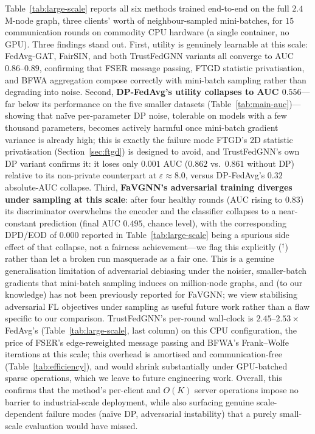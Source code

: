 \documentclass[pdflatex,sn-mathphys-num]{sn-jnl}
\theoremstyle{thmstyleone}%
\theoremstyle{thmstyletwo}%
\theoremstyle{thmstylethree}%
\begin{document}
Table~\ref{tab:large-scale} reports all six methods trained end-to-end on the
full $2.4$M-node graph, three clients' worth of neighbour-sampled mini-batches,
for $15$ communication rounds on commodity CPU hardware (a single
container, no GPU). Three findings stand out. First, utility is genuinely
learnable at this scale: FedAvg-GAT, FairSIN, and both TrustFedGNN variants all
converge to AUC $0.86$--$0.89$, confirming that FSER message passing, FTGD
statistic privatisation, and BFWA aggregation compose correctly with
mini-batch sampling rather than degrading into noise. Second,
\textbf{DP-FedAvg's utility collapses to AUC $0.556$}---far below its
performance on the five smaller datasets (Table~\ref{tab:main-auc})---showing
that naïve per-parameter DP noise, tolerable on models with a few thousand
parameters, becomes actively harmful once mini-batch gradient variance is
already high; this is exactly the failure mode FTGD's 2D statistic
privatisation (Section~\ref{sec:ftgd}) is designed to avoid, and TrustFedGNN's
own DP variant confirms it: it loses only $0.001$ AUC ($0.862$ vs.\ $0.861$
without DP) relative to its non-private counterpart at $\varepsilon\approx 8.0$,
versus DP-FedAvg's $0.32$ absolute-AUC collapse. Third,
\textbf{FaVGNN's adversarial training diverges under sampling at this scale}:
after four healthy rounds (AUC rising to $0.83$) its discriminator overwhelms
the encoder and the classifier collapses to a near-constant prediction (final
AUC $0.495$, chance level), with the corresponding DPD/EOD of $0.000$ reported
in Table~\ref{tab:large-scale} being a spurious side effect of that collapse,
not a fairness achievement---we flag this explicitly ($^{\dagger}$) rather
than let a broken run masquerade as a fair one. This is a genuine
generalisation limitation of adversarial debiasing under the noisier,
smaller-batch gradients that mini-batch sampling induces on million-node
graphs, and (to our knowledge) has not been previously reported for FaVGNN;
we view stabilising adversarial FL objectives under sampling as useful future
work rather than a flaw specific to our comparison. TrustFedGNN's per-round
wall-clock is $2.45$--$2.53\times$ FedAvg's (Table~\ref{tab:large-scale},
last column) on this CPU configuration, the price of FSER's edge-reweighted
message passing and BFWA's Frank--Wolfe iterations at this scale; this
overhead is amortised and communication-free (Table~\ref{tab:efficiency}), and
would shrink substantially under GPU-batched sparse operations, which we
leave to future engineering work. Overall, this confirms that the method's
per-client and $O(K)$ server operations impose no barrier to industrial-scale
deployment, while also surfacing genuine scale-dependent failure modes
(naïve DP, adversarial instability) that a purely small-scale evaluation
would have missed.
\end{document}
